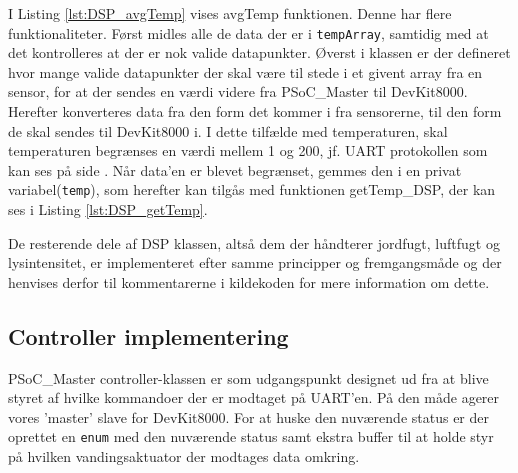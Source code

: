 \clearpage



I Listing \ref{lst:DSP_avgTemp} vises avgTemp funktionen. Denne har flere funktionaliteter. Først midles alle de data der er i \texttt{tempArray}, samtidig med at det kontrolleres at der er nok valide datapunkter. Øverst i klassen er der defineret hvor mange valide datapunkter der skal være til stede i et givent array fra en sensor, for at der sendes en værdi videre fra PSoC\_Master til DevKit8000. Herefter konverteres data fra den form det kommer i fra sensorerne, til den form de skal sendes til DevKit8000 i. I dette tilfælde med temperaturen, skal temperaturen begrænses en værdi mellem 1 og 200, jf. UART protokollen som kan ses på side \pageref{sec:UART_protokol}. Når data'en er blevet begrænset, gemmes den i en privat variabel(\texttt{temp}), som herefter kan tilgås med funktionen getTemp\_DSP, der kan ses i Listing \ref{lst:DSP_getTemp}.



De resterende dele af DSP klassen, altså dem der håndterer jordfugt, luftfugt og lysintensitet, er implementeret efter samme principper og fremgangsmåde og der henvises derfor til kommentarerne i kildekoden\cite{lib:PSoC_m_git} for mere information om dette.

\clearpage



\subsection{Controller implementering} \label{sec:Controller_impl}

PSoC\_Master controller-klassen er som udgangspunkt designet ud fra at blive styret af hvilke kommandoer der er modtaget på UART'en. På den måde agerer vores 'master' slave for DevKit8000. 
For at huske den nuværende status er der oprettet en \texttt{enum} med den nuværende status samt ekstra buffer til at holde styr på hvilken vandingsaktuator der modtages data omkring.



